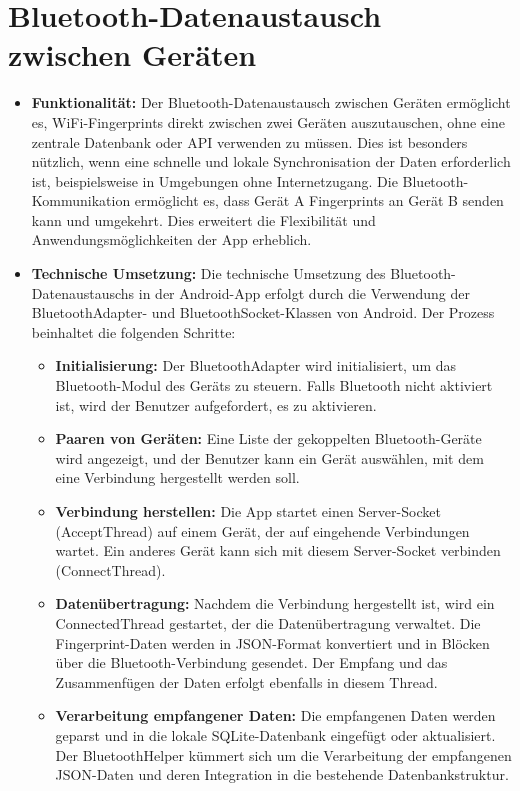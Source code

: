 \section{Bluetooth-Datenaustausch zwischen Geräten}
\begin{itemize}
    \item \textbf{Funktionalität:} Der Bluetooth-Datenaustausch zwischen Geräten ermöglicht es, WiFi-Fingerprints direkt zwischen zwei Geräten auszutauschen, ohne eine zentrale Datenbank oder API verwenden zu müssen. Dies ist besonders nützlich, wenn eine schnelle und lokale Synchronisation der Daten erforderlich ist, beispielsweise in Umgebungen ohne Internetzugang. Die Bluetooth-Kommunikation ermöglicht es, dass Gerät A Fingerprints an Gerät B senden kann und umgekehrt. Dies erweitert die Flexibilität und Anwendungsmöglichkeiten der App erheblich.

    \item \textbf{Technische Umsetzung:} Die technische Umsetzung des Bluetooth-Datenaustauschs in der Android-App erfolgt durch die Verwendung der BluetoothAdapter- und BluetoothSocket-Klassen von Android. Der Prozess beinhaltet die folgenden Schritte:
          \begin{itemize}
              \item \textbf{Initialisierung:} Der BluetoothAdapter wird initialisiert, um das Bluetooth-Modul des Geräts zu steuern. Falls Bluetooth nicht aktiviert ist, wird der Benutzer aufgefordert, es zu aktivieren.
              \item \textbf{Paaren von Geräten:} Eine Liste der gekoppelten Bluetooth-Geräte wird angezeigt, und der Benutzer kann ein Gerät auswählen, mit dem eine Verbindung hergestellt werden soll.
              \item \textbf{Verbindung herstellen:} Die App startet einen Server-Socket (AcceptThread) auf einem Gerät, der auf eingehende Verbindungen wartet. Ein anderes Gerät kann sich mit diesem Server-Socket verbinden (ConnectThread).
              \item \textbf{Datenübertragung:} Nachdem die Verbindung hergestellt ist, wird ein ConnectedThread gestartet, der die Datenübertragung verwaltet. Die Fingerprint-Daten werden in JSON-Format konvertiert und in Blöcken über die Bluetooth-Verbindung gesendet. Der Empfang und das Zusammenfügen der Daten erfolgt ebenfalls in diesem Thread.
              \item \textbf{Verarbeitung empfangener Daten:} Die empfangenen Daten werden geparst und in die lokale SQLite-Datenbank eingefügt oder aktualisiert. Der BluetoothHelper kümmert sich um die Verarbeitung der empfangenen JSON-Daten und deren Integration in die bestehende Datenbankstruktur.
          \end{itemize}


\end{itemize}
